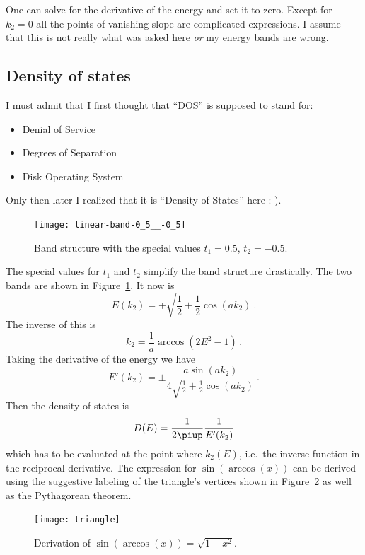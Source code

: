 \documentclass[11pt, english, fleqn, DIV=15, headinclude, BCOR=1cm]{scrartcl}
\begin{document}
One can solve for the derivative of the energy and set it to zero. Except for
$k_2 = 0$ all the points of vanishing slope are complicated expressions. I
assume that this is not really what was asked here \emph{or} my energy bands
are wrong.

\subsection{Density of states}

I must admit that I first thought that “DOS” is supposed to stand for:

\begin{itemize}
    \item Denial of Service
    \item Degrees of Separation
    \item Disk Operating System
\end{itemize}

Only then later I realized that it is “Density of States” here :-).

\begin{figure}
    \centering
    \texttt{[image: linear-band-0\_5\_\_-0\_5]}
    \caption{%
        Band structure with the special values $t_1 = \num{0.5}$, $t_2 =
        \num{-0.5}$.
    }
    \label{fig:band-3}
\end{figure}

The special values for $t_1$ and $t_2$ simplify the band structure drastically.
The two bands are shown in Figure~\ref{fig:band-3}. It now is
\[
    E(k_2) = \mp \sqrt{\frac 12 + \frac 12 \cos(a k_2)} \,.
\]
The inverse of this is
\[
    k_2 = \frac 1a \arccos(2 E^2 - 1) \,.
\]
Taking the derivative of the energy we have
\[
    E'(k_2) = \pm \frac{a \sin(a k_2)}{4 \sqrt{\frac 12 + \frac 12 \cos(a
    k_2)}} \,.
\]
Then the density of states is
\[
    D(E) = \frac{1}{2 \piup} \frac{1}{E'(k_2)}
\]
which has to be evaluated at the point where $k_2(E)$, i.e.\ the inverse
function in the reciprocal derivative. The expression for $\sin(\arccos(x))$
can be derived using the suggestive labeling of the triangle's vertices shown
in Figure~\ref{fig:triangle} as well as the Pythagorean theorem.

\begin{figure}
    \centering
    \texttt{[image: triangle]}
    \caption{%
        Derivation of $\sin(\arccos(x)) = \sqrt{1 - x^2}$.
    }
    \label{fig:triangle}
\end{figure}
\end{document}
